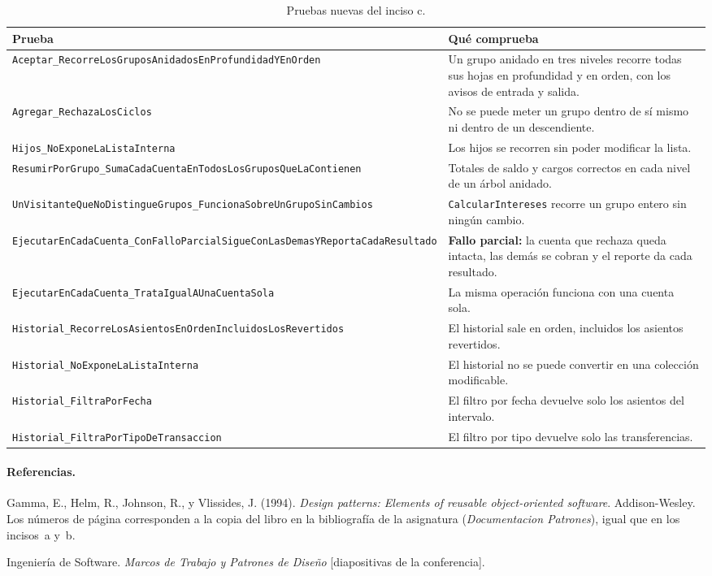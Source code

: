 \begin{table}[H]
\centering
\footnotesize
\begin{tabularx}{\textwidth}{>{\raggedright\arraybackslash}p{7.2cm} >{\raggedright\arraybackslash}X}
\toprule
\textbf{Prueba} & \textbf{Qué comprueba} \\
\midrule
\texttt{Aceptar\_RecorreLosGruposAnidados\-EnProfundidadYEnOrden} & Un grupo anidado en tres
  niveles recorre todas sus hojas en profundidad y en orden, con los avisos de entrada y
  salida. \\
\texttt{Agregar\_RechazaLosCiclos} & No se puede meter un grupo dentro de sí mismo ni dentro de
  un descendiente. \\
\texttt{Hijos\_NoExponeLaListaInterna} & Los hijos se recorren sin poder modificar la lista. \\
\texttt{ResumirPorGrupo\_SumaCadaCuentaEn\-TodosLosGruposQueLaContienen} & Totales de saldo y
  cargos correctos en cada nivel de un árbol anidado. \\
\texttt{UnVisitanteQueNoDistingueGrupos\_\-FuncionaSobreUnGrupoSinCambios} &
  \texttt{CalcularIntereses} recorre un grupo entero sin ningún cambio. \\
\texttt{EjecutarEnCadaCuenta\_ConFalloParcial\-SigueConLasDemasYReportaCadaResultado} &
  \textbf{Fallo parcial:} la cuenta que rechaza queda intacta, las demás se cobran y el reporte
  da cada resultado. \\
\texttt{EjecutarEnCadaCuenta\_TrataIgual\-AUnaCuentaSola} & La misma operación funciona con una
  cuenta sola. \\
\texttt{Historial\_RecorreLosAsientosEnOrden\-IncluidosLosRevertidos} & El historial sale en
  orden, incluidos los asientos revertidos. \\
\texttt{Historial\_NoExponeLaListaInterna} & El historial no se puede convertir en una
  colección modificable. \\
\texttt{Historial\_FiltraPorFecha} & El filtro por fecha devuelve solo los asientos del
  intervalo. \\
\texttt{Historial\_FiltraPorTipoDeTransaccion} & El filtro por tipo devuelve solo las
  transferencias. \\
\bottomrule
\end{tabularx}
\caption{Pruebas nuevas del inciso c.}
\end{table}

\paragraph{Referencias.}
Gamma, E., Helm, R., Johnson, R., y Vlissides, J. (1994). \emph{Design patterns: Elements of
reusable object-oriented software}. Addison-Wesley. Los números de página corresponden a la
copia del libro en la bibliografía de la asignatura (\emph{Documentacion Patrones}), igual que
en los incisos~a y~b.

Ingeniería de Software. \emph{Marcos de Trabajo y Patrones de Diseño} [diapositivas de la
conferencia].
\endgroup
